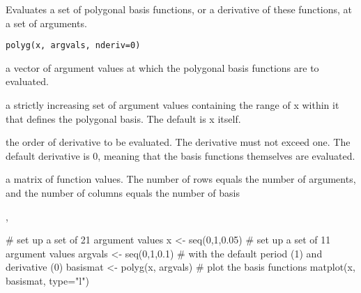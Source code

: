 \begin{Description}\relax
Evaluates a set of polygonal basis functions, or a derivative of these
functions, at a set of arguments.
\end{Description}
\begin{Usage}
\begin{verbatim}
polyg(x, argvals, nderiv=0)
\end{verbatim}
\end{Usage}
\begin{Arguments}
\begin{ldescription}
\item[\code{x}] a vector of argument values at which the polygonal basis functions are to
evaluated.

\item[\code{argvals}] a strictly increasing set of argument values containing the range of x
within it that defines the polygonal basis.  The default is x itself.

\item[\code{nderiv}] the order of derivative to be evaluated.  The derivative must not exceed
one.  The default derivative is 0, meaning that the basis functions
themselves are evaluated.

\end{ldescription}
\end{Arguments}
\begin{Value}
a matrix of function values.  The number of rows equals the number of
arguments, and the number of columns equals the number of basis
\end{Value}
\begin{SeeAlso}\relax
{}, 
\end{SeeAlso}
\begin{Examples}
\begin{ExampleCode}

#  set up a set of 21 argument values
x <- seq(0,1,0.05)
#  set up a set of 11 argument values
argvals <- seq(0,1,0.1)
#  with the default period (1) and derivative (0)
basismat <- polyg(x, argvals)
#  plot the basis functions
matplot(x, basismat, type="l")

\end{ExampleCode}
\end{Examples}

